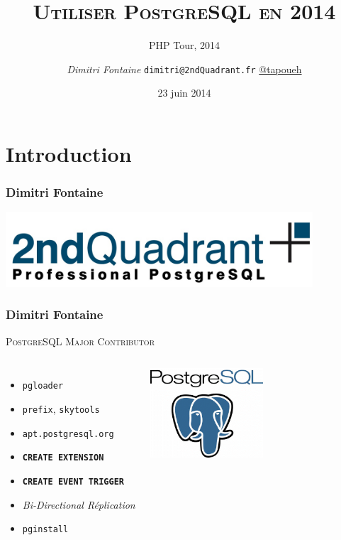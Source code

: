 \documentclass{beamer}
\title{\textsc{Utiliser PostgreSQL en 2014}}
\subtitle{PHP Tour, 2014}
\author{\textit{Dimitri Fontaine} \texttt{dimitri@2ndQuadrant.fr}
  \linebreak
  \url{@tapoueh}}
\date{23 juin 2014}
\begin{document}
\frame{\titlepage}

\section{Introduction}

\begin{frame}
  \frametitle{Dimitri Fontaine}

  \begin{center}
    \includegraphics[height=1.1in]{2ndquadrant_logo_full_color.jpg}
  \end{center}
\end{frame}

\begin{frame}[fragile]
  \frametitle{Dimitri Fontaine}

  \begin{center}
    {\Large \textsc{PostgreSQL Major Contributor}}
  \end{center}

  \begin{columns}[c]

    \begin{itemize}
    \item \texttt{pgloader}
    \item \texttt{prefix}, \texttt{skytools}
    \item \texttt{apt.postgresql.org}
    \item \texttt{\textbf{CREATE EXTENSION}}
    \item \texttt{\textbf{CREATE EVENT TRIGGER}}
    \item \textit{Bi-Directional Réplication}
    \item \texttt{pginstall}
    \end{itemize}  

    \begin{center}
      \includegraphics[height=9em]{postgres-logo.png}
    \end{center}
  \end{columns}
\end{frame}
\end{document}

